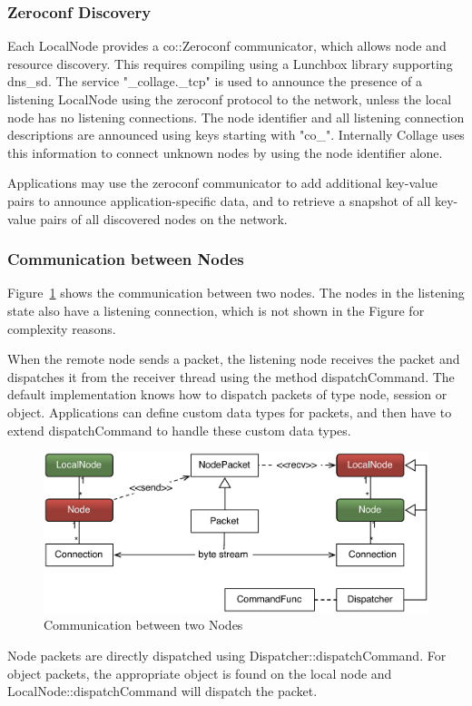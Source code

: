 \documentclass[10pt,a4]{scrartcl}
\newcommand{\fig}[1]{Figure~\ref{#1}}
\begin{document}
\subsubsection{\label{sZeroconf}Zeroconf Discovery}

Each \textsf{LocalNode} provides a \textsf{co::Zeroconf} communicator, which
allows node and resource discovery. This requires compiling using a Lunchbox
library supporting dns\_sd. The service "\_collage.\_tcp" is used to announce
the presence of a listening \textsf{LocalNode} using the zeroconf protocol to
the network, unless the local node has no listening connections. The node
identifier and all listening connection descriptions are announced using keys
starting with "co\_". Internally Collage uses this information to connect
unknown nodes by using the node identifier alone.

Applications may use the zeroconf communicator to add additional key-value pairs
to announce application-specific data, and to retrieve a snapshot of all
key-value pairs of all discovered nodes on the network.

\subsubsection{Communication between Nodes}

\fig{fNetNode} shows the communication between two nodes. The nodes in
the listening state also have a listening connection, which is not shown
in the Figure for complexity reasons.

When the remote node sends a packet, the listening node receives the
packet and dispatches it from the receiver thread using the method
\textsf{dispatchCommand}. The default implementation knows how to
dispatch packets of type node, session or object. Applications can
define custom data types for packets, and then have to extend
\textsf{dispatchCommand} to handle these custom data types.

\begin{figure}
  \includegraphics[width=.618\textwidth]{images/netNode.pdf}
  {\caption{\label{fNetNode}Communication between two Nodes}}
\end{figure}
Node packets are directly dispatched using
\textsf{Dispat\-cher::\-dis\-patchCommand}. For object packets, the appropriate
object is found on the local node and \textsf{LocalNode::dis\-patchCommand} will
dispatch the packet.
\end{document}
